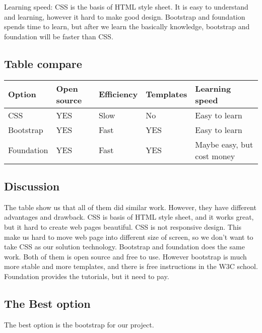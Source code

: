 Learning speed: CSS is the basis of HTML style sheet. It is easy to understand and learning, however it hard to make good design. Bootstrap and foundation spends time to learn, but after we learn the basically knowledge, bootstrap and foundation will be faster than CSS.

\subsection{Table compare}
\begin{center}
  \begin{tabular}{ | l | l | l | l |p{5cm} |}
  \hline
  Option & Open source & Efficiency & Templates & Learning speed\\ \hline
  CSS & YES & Slow & No & Easy to learn\\ \hline
  Bootstrap & YES & Fast & YES & Easy to learn\\ \hline
  Foundation & YES & Fast & YES & Maybe easy, but cost money\\ \hline
  \end{tabular}
\end{center}

\subsection{Discussion}
The table show us that all of them did similar work. However, they have different advantages and drawback. CSS is basis of HTML style sheet, and it works great, but it hard to create web pages beautiful. CSS is not responsive design. This make us hard to move web page into different size of screen, so we don't want to take CSS as our solution technology. Bootstrap and foundation does the same work. Both of them is open source and free to use. However bootstrap is much more stable and more templates, and there is free instructions in the W3C school. Foundation provides the tutorials, but it need to pay.

\subsection{The Best option}
The best option is the bootstrap for our project.

